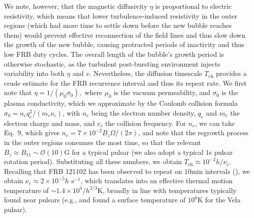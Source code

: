 \documentclass{aa}
\begin{document}
We note, however, that the magnetic diffusivity $\eta$ is proportional to electric resistivity, which means that lower turbulence-induced resistivity in the outer regions (which had more time to settle down before the new bubble reaches them) would prevent effective reconnection of the field lines and thus slow down the growth of the new bubble, causing protracted periods of inactivity and thus low FRB duty cycles. The overall length of the bubble's growth period is otherwise stochastic, as the turbulent post-bursting environment injects variability into both $\eta$ and $v$. Nevertheless, the diffusion timescale $T_{\text{ch}}$ provides a crude estimate for the FRB recurrence interval and thus its repeat rate. We first note that $\eta = 1/(\mu_0 \sigma_0),$ where $\mu_0$ is the vacuum permeability, and $\sigma_0$ is the plasma conductivity, which we approximate by the Coulomb collision formula $\sigma_0 = n_e q_e^2/(m_e \nu_c)$, with $n_e$ being the electron number density, $q_e$ and $m_e$ the electron charge and mass, and $v_c$ the collision frequency. For $n_e$, we can take \cite{Goldreich:1969sb} Eq.~9, which gives 
$n_e = 7\times 10^{-2}B_z \Omega/(2\pi)$, and note that the regrowth process in the outer regions consumes the most time, so that
the relevant $B_z \approx B_{11} \sim \mathcal{O}(10)$G for a typical pulsar (we also adopt a typical $1$s pulsar rotation period). Substituting all these numbers, we obtain $T_{\text{ch}}\approx 10^{-2} h/\nu_c$. Recalling that FRB 121102 has been observed to repeat on $10$min intervals (\cite{Spitler:2016dmz}), we obtain $\nu_e \approx 2\times 10^{-5} h$ $\text{s}^{-1}$, which translates into an effective thermal motion temperature of $\sim 1.4\times 10^4/h^{2/3}$K, broadly in line with temperatures typically found near pulsars (e.g., \cite{1996rftu.proc..173P} and \cite{2001ApJ...552L.129P} found a surface temperature of $10^6$K for the Vela pulsar).
\end{document}
